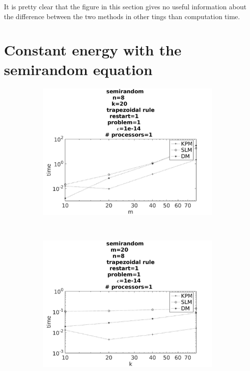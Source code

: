 It is pretty clear that the figure in this section gives no useful information about the difference between the two methods in other tings than computation time.



\section{Constant energy with the semirandom equation}



\begin{figure}[H]
        \centering
        \begin{subfigure}[b]{0.45\textwidth}
                \includegraphics[width=\textwidth]{../MATLAB/fig/sresulttimem.jpg}
                \caption{  }
                \label{fig:sresulttimem}
        \end{subfigure}
        ~
        \begin{subfigure}[b]{0.45\textwidth}
                \includegraphics[width=\textwidth]{../MATLAB/fig/sresulttimek.jpg}

\end{subfigure}
\end{figure}
